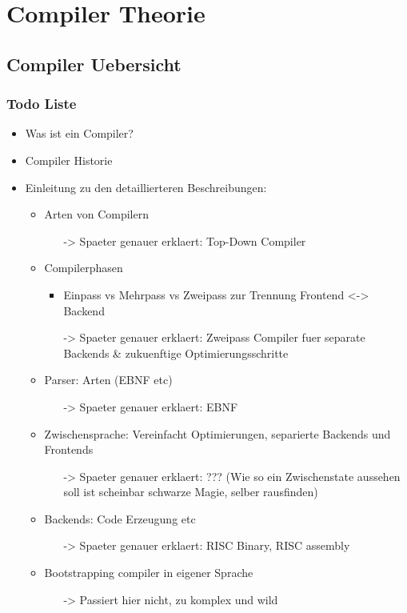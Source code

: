 \part{Compiler Theorie}
\chapter{Compiler Uebersicht}
\label{chap:theory:compilerHistory}

\section{Todo Liste}

\begin{itemize}
  \item Was ist ein Compiler?
  \item Compiler Historie
  \item Einleitung zu den detaillierteren Beschreibungen:
  \begin{itemize}
    \item Arten von Compilern 
    \begin{itemize}
    \item[->] Spaeter genauer erklaert: Top-Down Compiler
    \end{itemize}
    \item Compilerphasen
    \begin{itemize}
      \item Einpass vs Mehrpass vs Zweipass zur Trennung Frontend <-> Backend
      \item[->] Spaeter genauer erklaert: Zweipass Compiler fuer separate Backends \& zukuenftige Optimierungsschritte
    \end{itemize}
    \item Parser: Arten (EBNF etc)
    \begin{itemize}
    \item[->] Spaeter genauer erklaert: EBNF
    \end{itemize}
    \item Zwischensprache: Vereinfacht Optimierungen, separierte Backends und Frontends
    \begin{itemize}
      \item[->] Spaeter genauer erklaert: ??? (Wie so ein Zwischenstate aussehen soll ist scheinbar schwarze Magie, selber rausfinden)
    \end{itemize}
    \item Backends: Code Erzeugung etc
    \begin{itemize}
      \item[->] Spaeter genauer erklaert: RISC Binary, RISC assembly
    \end{itemize}
    \item Bootstrapping compiler in eigener Sprache
    \begin{itemize}
      \item[->] Passiert hier nicht, zu komplex und wild
    \end{itemize}
  \end{itemize}
\end{itemize}


